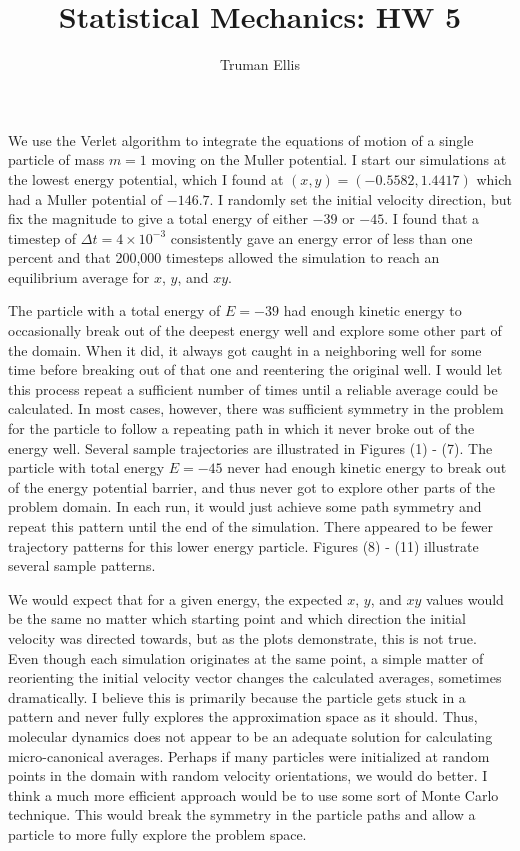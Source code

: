 \documentclass[letterpaper]{article}
\title{Statistical Mechanics: HW 5}
\author{Truman Ellis}
\begin{document}
\maketitle

We use the Verlet algorithm to integrate the equations of motion of a single particle of mass
$m=1$ moving on the Muller potential. I start our simulations at the lowest
energy potential, which I found at $(x,y) = (-0.5582, 1.4417)$ which had a
Muller potential of $-146.7$. I randomly set the initial velocity direction, but
fix the magnitude to give a total energy of either $-39$ or $-45$. I found that
a timestep of $\Delta t=4\times10^{-3}$ consistently gave an energy error of less
than one percent and that 200,000 timesteps allowed the simulation to reach an
equilibrium average for $x$, $y$, and $xy$. 

The particle with a total energy of $E=-39$ had enough kinetic energy to
occasionally break out of the deepest energy well and explore some other part of
the domain. When it did, it always got caught in a neighboring well for some
time before breaking out of that one and reentering the original well. I would
let this process repeat a sufficient number of times until a reliable average
could be calculated. In most cases, however, there was sufficient symmetry in the problem
for the particle to follow a repeating path in which it never broke out of the
energy well. Several sample trajectories are illustrated in Figures (1) - (7).
The particle with total energy $E=-45$ never had enough kinetic
energy to break out of the energy potential barrier, and thus never got to
explore other parts of the problem domain. In each run, it would just achieve
some path symmetry and repeat this pattern until the end of the simulation.
There appeared to be fewer trajectory patterns for this lower energy particle.
Figures (8) - (11) illustrate several sample patterns.

We would expect that for a given energy, the expected $x$, $y$, and $xy$ values
would be the same no matter which starting point and which direction the initial
velocity was directed towards, but as the plots demonstrate, this is not true.
Even though each simulation originates at the same point, a simple matter of
reorienting the initial velocity vector changes the calculated averages,
sometimes dramatically. I believe this is primarily because the particle gets
stuck in a pattern and never fully explores the approximation space as it
should. Thus, molecular dynamics does not appear to be an adequate solution for
calculating micro-canonical averages. Perhaps if many particles were initialized
at random points in the domain with random velocity orientations, we would do
better. I think a much more efficient approach would be to use some sort of
Monte Carlo technique. This would break the symmetry in the particle paths and
allow a particle to more fully explore the problem space. 
\end{document}
